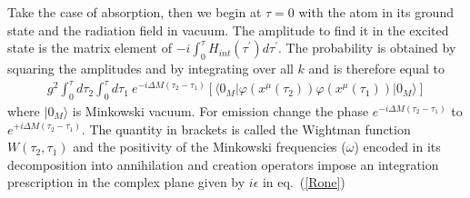 \documentclass[12pt,oneside]{report}
\def\ket#1{|#1\rangle}
\def\elematrice#1#2#3{\langle #1|#2|#3 \rangle}
\begin{document}
  Take the case of absorption, then
we begin at $\tau = 0$ with the atom in its ground state and
the radiation field in vacuum.  The amplitude to find it in the
excited state is the matrix element of $-i \int^\tau_0
H_{int}(\tau^\prime)d\tau^\prime$. The probability is
obtained by squaring the amplitudes and by integrating over all $k$ and is
therefore equal to
\begin{eqnarray}
g^2 \int^\tau_0 \! d\tau_2 \int^\tau_0 \! d\tau_1\ e^{-i \Delta M(\tau_2 -
\tau_1)} \left[ \elematrice{0_M}{\varphi \left(x^{\mu} (\tau_2)\right)
\varphi \left( x^{\mu }( \tau_1)\right) }{0_M} \right] 
\label{Rtwo}
\end{eqnarray}
where $\ket{0_M}$ is Minkowski vacuum.
For emission change the phase $e^{-i \Delta M  (\tau_2 -
\tau_1)}$ to
$e^{+i\Delta M (\tau_2 -
\tau_1)}$.  The quantity in brackets is called the
Wightman function $W(\tau_2,\tau_1)$ and the positivity of the Minkowski
frequencies ($\omega$) encoded in
its decomposition into annihilation and creation operators impose an
integration prescription in the complex plane 
given by $i\epsilon$ in eq.~(\ref{Rone})
\end{document}
